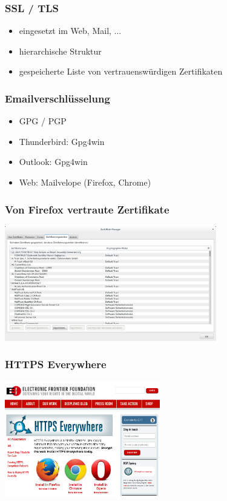 \documentclass[12pt]{beamer}
\begin{document}
\begin{frame}
    \frametitle{SSL / TLS}
    \begin{itemize}
      \item<2-> eingesetzt im Web, Mail, ...
      \item<3-> hierarchische Struktur
      \item<4-> gespeicherte Liste von vertrauenswürdigen Zertifikaten
    \end{itemize}
\end{frame}

\begin{frame}
    \frametitle{Emailverschlüsselung}
    \begin{itemize}\Large
      \item GPG / PGP
      \item Thunderbird: Gpg4win
      \item Outlook: Gpg4win
      \item Web: Mailvelope (Firefox, Chrome)
    \end{itemize}
\end{frame}

\begin{frame}
    \frametitle{Von Firefox vertraute Zertifikate}
    \begin{center}
      \includegraphics[height=5cm]{img/zertifikate.png}
    \end{center}
\end{frame}

\begin{frame}
  \frametitle{HTTPS Everywhere}
    \begin{center}
      \includegraphics[height=5cm]{img/https-everywhere.png}
    \end{center}
\end{frame}
\end{document}
